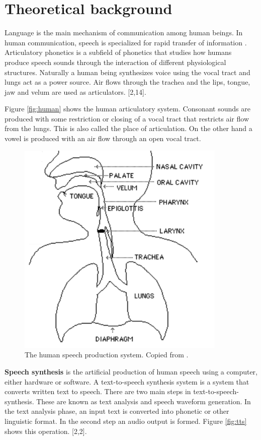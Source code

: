 \documentclass[11pt,a4paper,oneside,article]{memoir}
\begin{document}
\clearpage	
\chapter{Theoretical background}
Language is the main mechanism of communication among human beings. In human communication, speech is specialized for rapid transfer of information \cite{vocal}. Articulatory phonetics is a subfield of phonetics that studies how humans produce speech sounds through the interaction of different physiological structures. Naturally a human being synthesizes voice using the vocal tract and lungs act as a power source. Air flows through the trachea and the lips, tongue, jaw and velum are used as articulators. [2,14].

Figure \vref{fig:human} shows the human articulatory system. Consonant sounds are produced with some restriction or closing of a vocal tract that restricts air flow from the lungs. This is also called the place of articulation. On the other hand a vowel is produced with an air flow through an open vocal tract.

\begin{figure}[h]
  \includegraphics[width=10cm]{human}
  \caption{The human speech production system. Copied from \cite{vocal}.}
  \label{fig:human}
\end{figure}

\newpage
\textbf{Speech synthesis} is the artificial production of human speech using a computer, either hardware or software. A text-to-speech synthesis system is a system that converts written text to speech. There are two main steps in text-to-speech-synthesis. These are known as text analysis and speech waveform generation. In the text analysis phase, an input text is converted into phonetic or other linguistic format. In the second step an audio output is formed. Figure \vref{fig:tts} shows this operation. [2,2].
\end{document}
